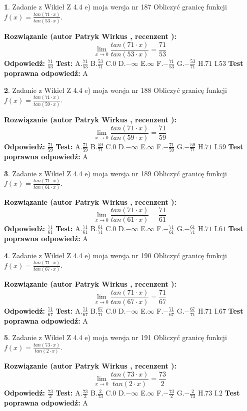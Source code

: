 \documentclass[12pt, a4paper]{article}
\theoremstyle{definition} %
\newtheorem{zad}{}
\newcommand{\zadStart}[1]{\begin{zad}#1\newline}
\newcommand{\zadStop}{\end{zad}}
\newcommand{\rozwStart}[2]{\noindent \textbf{Rozwiązanie (autor #1 , recenzent #2): }\newline}
\newcommand{\rozwStop}{\newline}
\newcommand{\odpStart}{\noindent \textbf{Odpowiedź:}\newline}
\newcommand{\odpStop}{\newline}
\newcommand{\testStart}{\noindent \textbf{Test:}\newline}
\newcommand{\testStop}{\newline}
\newcommand{\kluczStart}{\noindent \textbf{Test poprawna odpowiedź:}\newline}
\newcommand{\kluczStop}{\newline}
\begin{document}
\zadStart{Zadanie z Wikieł Z 4.4 e) moja wersja nr 187}
Obliczyć granicę funkcji $f(x)=\frac{tan(71\cdot x)}{tan(53\cdot x)}$.
\zadStop
\rozwStart{Patryk Wirkus}{}
$$\lim\limits_{x\to 0}\frac{tan(71\cdot x)}{tan(53\cdot x)}=
\frac{71}{53}$$
\rozwStop
\odpStart
$\frac{71}{53}$
\odpStop
\testStart
A.$\frac{71}{53}$
B.$\frac{53}{71}$
C.$0$
D.$-\infty$
E.$\infty$
F.$-\frac{71}{53}$
G.$-\frac{53}{71}$
H.$71$
I.$53$
\testStop
\kluczStart
A
\kluczStop



\zadStart{Zadanie z Wikieł Z 4.4 e) moja wersja nr 188}
Obliczyć granicę funkcji $f(x)=\frac{tan(71\cdot x)}{tan(59\cdot x)}$.
\zadStop
\rozwStart{Patryk Wirkus}{}
$$\lim\limits_{x\to 0}\frac{tan(71\cdot x)}{tan(59\cdot x)}=
\frac{71}{59}$$
\rozwStop
\odpStart
$\frac{71}{59}$
\odpStop
\testStart
A.$\frac{71}{59}$
B.$\frac{59}{71}$
C.$0$
D.$-\infty$
E.$\infty$
F.$-\frac{71}{59}$
G.$-\frac{59}{71}$
H.$71$
I.$59$
\testStop
\kluczStart
A
\kluczStop



\zadStart{Zadanie z Wikieł Z 4.4 e) moja wersja nr 189}
Obliczyć granicę funkcji $f(x)=\frac{tan(71\cdot x)}{tan(61\cdot x)}$.
\zadStop
\rozwStart{Patryk Wirkus}{}
$$\lim\limits_{x\to 0}\frac{tan(71\cdot x)}{tan(61\cdot x)}=
\frac{71}{61}$$
\rozwStop
\odpStart
$\frac{71}{61}$
\odpStop
\testStart
A.$\frac{71}{61}$
B.$\frac{61}{71}$
C.$0$
D.$-\infty$
E.$\infty$
F.$-\frac{71}{61}$
G.$-\frac{61}{71}$
H.$71$
I.$61$
\testStop
\kluczStart
A
\kluczStop



\zadStart{Zadanie z Wikieł Z 4.4 e) moja wersja nr 190}
Obliczyć granicę funkcji $f(x)=\frac{tan(71\cdot x)}{tan(67\cdot x)}$.
\zadStop
\rozwStart{Patryk Wirkus}{}
$$\lim\limits_{x\to 0}\frac{tan(71\cdot x)}{tan(67\cdot x)}=
\frac{71}{67}$$
\rozwStop
\odpStart
$\frac{71}{67}$
\odpStop
\testStart
A.$\frac{71}{67}$
B.$\frac{67}{71}$
C.$0$
D.$-\infty$
E.$\infty$
F.$-\frac{71}{67}$
G.$-\frac{67}{71}$
H.$71$
I.$67$
\testStop
\kluczStart
A
\kluczStop



\zadStart{Zadanie z Wikieł Z 4.4 e) moja wersja nr 191}
Obliczyć granicę funkcji $f(x)=\frac{tan(73\cdot x)}{tan(2\cdot x)}$.
\zadStop
\rozwStart{Patryk Wirkus}{}
$$\lim\limits_{x\to 0}\frac{tan(73\cdot x)}{tan(2\cdot x)}=
\frac{73}{2}$$
\rozwStop
\odpStart
$\frac{73}{2}$
\odpStop
\testStart
A.$\frac{73}{2}$
B.$\frac{2}{73}$
C.$0$
D.$-\infty$
E.$\infty$
F.$-\frac{73}{2}$
G.$-\frac{2}{73}$
H.$73$
I.$2$
\testStop
\kluczStart
A
\kluczStop
\end{document}
